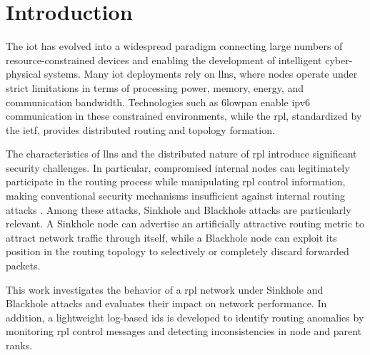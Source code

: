 \section{Introduction}
The \gls{iot} has evolved into a widespread paradigm connecting large numbers of resource-constrained devices and enabling the development of intelligent cyber-physical systems.
Many \gls{iot} deployments rely on \glspl{lln}, where nodes operate under strict limitations in terms of processing power, memory, energy, and communication bandwidth.
Technologies such as \gls{6lowpan} enable \gls{ipv6} communication in these constrained environments, while the \gls{rpl}, standardized by the \gls{ietf}, provides distributed routing and topology formation.

The characteristics of \glspl{lln} and the distributed nature of \gls{rpl} introduce significant security challenges.
In particular, compromised internal nodes can legitimately participate in the routing process while manipulating \gls{rpl} control information, making conventional security mechanisms insufficient against internal routing attacks \cite{farzaneh2019anomaly}.
Among these attacks, Sinkhole and Blackhole attacks are particularly relevant. A Sinkhole node can advertise an artificially attractive routing metric to attract network traffic through itself, while a Blackhole node can exploit its position in the routing topology to selectively or completely discard forwarded packets.

This work investigates the behavior of a \gls{rpl} network under Sinkhole and Blackhole attacks and evaluates their impact on network performance.
In addition, a lightweight log-based \gls{ids} is developed to identify routing anomalies by monitoring \gls{rpl} control messages and detecting inconsistencies in node and parent ranks.